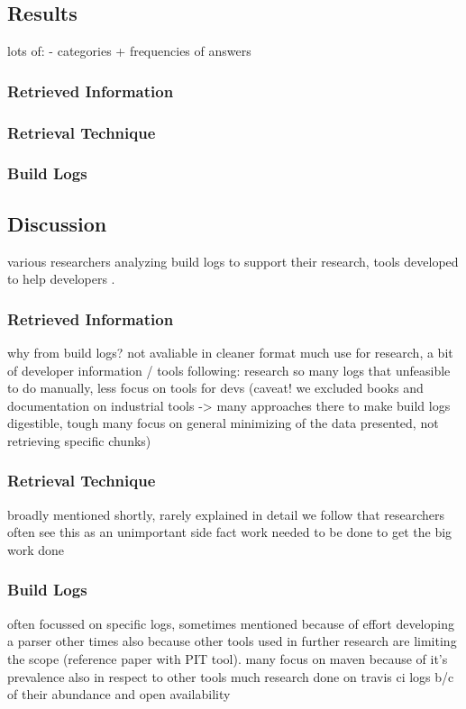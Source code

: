 \subsection{Results}
lots of:
- categories + frequencies of answers

\subsubsection{Retrieved Information}

\subsubsection{Retrieval Technique}

\subsubsection{Build Logs}

\subsection{Discussion}
various researchers analyzing build logs to support their research,
tools developed to help developers .

\subsubsection{Retrieved Information}
why from build logs? not avaliable in cleaner format much use for
research, a bit of developer information / tools following: research
so many logs that unfeasible to do manually, less focus on tools for
devs (caveat! we excluded books and documentation on industrial tools
-> many approaches there to make build logs digestible, tough many
focus on general minimizing of the data presented, not retrieving
specific chunks)

\subsubsection{Retrieval Technique}
broadly mentioned shortly, rarely explained in detail we follow that
researchers often see this as an unimportant side fact work needed to
be done to get the big work done

\subsubsection{Build Logs}
often focussed on specific logs, sometimes mentioned because of effort
developing a parser other times also because other tools used in
further research are limiting the scope (reference paper with PIT
tool). many focus on maven because of it's prevalence also in respect
to other tools much research done on travis ci logs b/c of their
abundance and open availability


